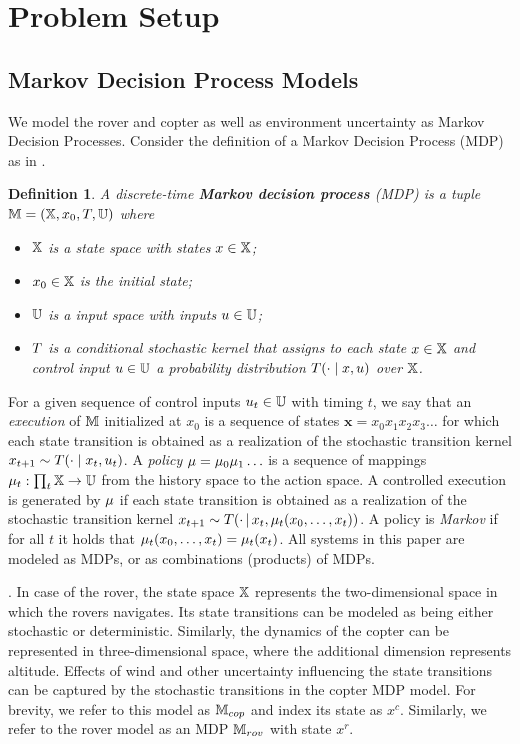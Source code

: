 \documentclass[conference]{IEEEtran}
\renewcommand{\cite}[1]{\citep{#1}}
\newtheorem{definition}{Definition}
\begin{document}
\section{Problem Setup}
\label{sec:problem}

\subsection{Markov Decision Process Models}
We model the rover and copter as well as environment uncertainty as Markov Decision Processes. Consider the definition of a Markov Decision Process (MDP) as in \cite{Bertsekas1978}.
\begin{definition}
\label{def:MDP}
  A discrete-time \textbf{Markov decision process} (MDP) is a tuple $\mathbb{M} = (\mathbb{X}, x_0,T, \mathbb{U})$ where
  \begin{itemize}
    \item $\mathbb{X}$ is a state space with states $x\in\mathbb{X}$; %
    \item $x_0\in \mathbb{X}$ is the initial state;
    \item $\mathbb{U}$ is a input space with inputs $u\in\mathbb{U}$;
    \item $T$ is a conditional stochastic kernel that assigns to each state $x\in \mathbb{X}$ and control input $u\in \mathbb{U}$ a probability distribution $T(\cdot\mid x,u)$ over $\mathbb{X}$.
  \end{itemize}
\end{definition}
For a given sequence of control inputs $u_t \in \mathbb{U}$ with timing $t$, we say that an \emph{execution} of $\mathbb{M}$ initialized at $x_0$ is a sequence of states $\mathbf x = x_0x_1x_2x_3\ldots $ for which each state transition is obtained as a realization of the stochastic transition kernel $x_{t+1} \sim T(\cdot \mid x_t, u_t)$. A \emph{policy} $\mu = \mu_0 \mu_1 \ldots$ is a sequence of mappings $\mu_t:\prod_{t}\mathbb{X}\rightarrow \mathbb{U}$ from the history space to the action space. A controlled execution is generated by $\mu$ if each state transition is obtained as a realization of the stochastic transition kernel $x_{t+1} \sim T(\cdot\,{ \mid}\, x_t, \mu_t(x_0,\ldots,x_t))$.  A policy is \emph{Markov}  if for all $t$ it holds that  $\mu_t(x_0, \ldots, x_t) = \mu_t(x_t)$. All systems in this paper are modeled as MDPs, or as combinations (products) of MDPs.

\smallskip
{}.
In case of the rover, the state space $\mathbb{X}$ represents the two-dimensional space in which the rovers navigates. Its state transitions can be modeled as being either stochastic or deterministic. Similarly, the dynamics of the copter can be represented in three-dimensional space, where the additional dimension represents altitude. Effects of wind and other uncertainty influencing the state transitions can be captured by the stochastic transitions in the copter MDP model. For brevity, we refer to this model as $\mathbb{M}_{cop}$ and index its state as $x^c$. Similarly, we refer to the rover model as an MDP $\mathbb{M}_{rov}$ with state $x^r$.
\end{document}
